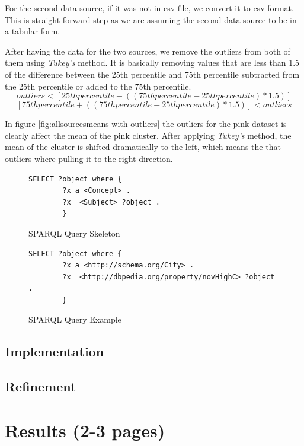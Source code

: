 \documentclass{article}
\begin{document}
For the second data source, if it was not in csv file, we convert it to csv format. This is straight forward step as we are assuming the second data source to be in a tabular form. 

After having the data for the two sources, we remove the outliers from both of them using \textit{Tukey\rq s} method. It is basically removing values that are less than 1.5 of the difference between the 25th percentile and 75th percentile subtracted from the 25th percentile or added to the 75th percentile. 
$$ outliers < [25th percentile - ( ( 75th percentile - 25th percentile )*1.5)] $$
$$ [ 75th percentile + ( ( 75th percentile - 25th percentile )*1.5)] < outliers  $$

In figure \ref{fig:allsourcesmeans-with-outliers} the outliers for the pink dataset is clearly affect the mean of the pink cluster. After applying \textit{Tukey\rq s} method, the mean of the cluster is shifted dramatically to the left, which means the that outliers where pulling it to the right direction.

\begin{figure}
  \caption{SPARQL Query Skeleton}
  \label{fig:sparql-sk}
\begin{lstlisting}[language=SPARQL]
SELECT ?object where {
        ?x a <Concept> .
        ?x  <Subject> ?object .
        }
\end{lstlisting}
\end{figure}

\begin{figure}
  \caption{SPARQL Query Example}
  \label{fig:sparql-example}
\begin{lstlisting}[language=SPARQL]
SELECT ?object where {
        ?x a <http://schema.org/City> .
        ?x  <http://dbpedia.org/property/novHighC> ?object .
        }
\end{lstlisting}
\end{figure}


\subsection{Implementation}
\subsection{Refinement}


\section{Results (2-3 pages)}
\end{document}
